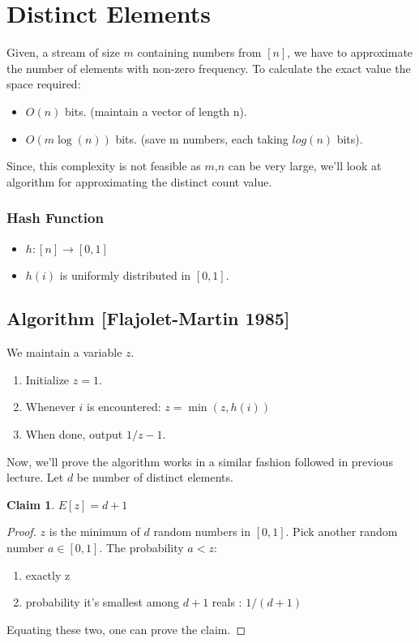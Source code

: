 \documentclass[11pt]{article}
\newtheorem{claim}[theorem]{Claim}
\begin{document}
\section{Distinct Elements}
Given, a stream of size $m$ containing numbers from $[n]$, we have to approximate the number of elements with non-zero frequency. To calculate the exact value the space required:

\begin{itemize}
\item $O(n)$ bits. (maintain a vector of length n).
\item $O(m \log (n))$ bits. (save m numbers, each taking $log(n)$ bits).
\end{itemize}

Since, this complexity is not feasible as $m$,$n$ can be very large, we'll look at algorithm for approximating the distinct count value.

\subsubsection{Hash Function}
\begin{itemize}
\item $h : [n] \rightarrow [0,1]$
\item $h(i)$ is uniformly distributed in $[0,1]$.
\end{itemize}

\subsection{Algorithm [Flajolet-Martin 1985]}
We maintain a variable $z$.
\begin{enumerate}
\item Initialize $z = 1$.
\item Whenever $i$ is encountered: $z = \min{(z,h(i))}$
\item When done, output $1/z -1$.
\end{enumerate}

Now, we'll prove the algorithm works in a similar fashion followed in previous lecture.
Let $d$ be number of distinct elements.

\begin{claim}
$E[z] = d+1$
\end{claim}

\begin{proof}
$z$ is the minimum of $d$ random numbers in $[0,1]$. Pick another random number $a \in [0,1]$. The probability $a<z$:
\begin{enumerate}
\item exactly z
\item probability it's smallest among $d+1$ reals : $1/(d+1)$
\end{enumerate}
Equating these two, one can prove the claim.
\end{proof}
\end{document}
